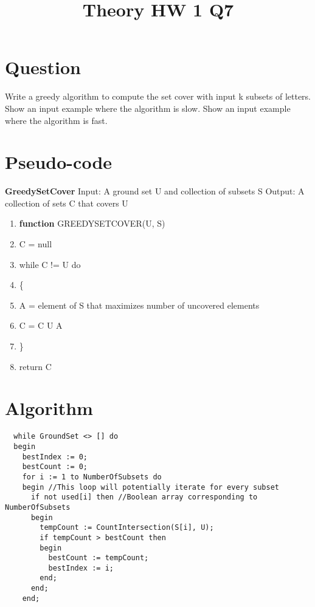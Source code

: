 \documentclass[conference]{IEEEtran}
\begin{document}
\title{Theory HW 1 Q7}

\author{
}

\maketitle

\section{Question}
%
Write a greedy algorithm to compute the set cover with input k subsets of letters. Show an
input example where the algorithm is slow. Show an input example where the algorithm is fast.



\section{Pseudo-code}

\textbf{GreedySetCover}
\newline
Input: A ground set U and collection of subsets S
Output: A collection of sets C that covers U

\begingroup
\renewcommand\labelenumi{\theenumi:}
\begin{enumerate}
\item \textbf{function} GREEDYSETCOVER(U, S)  \label{item:1}
\item C = null \label{item:2}
\item while C != U do \label{item:3}
\item \{ \label{item:4}
\item \indent A = element of S that maximizes number of uncovered elements \label{item:5}
\item \indent C = C U A \label{item:6}
\item \indent \} \label{item:7}
\item \indent return C \label{item:8}
\end{enumerate}
\endgroup

\section{Algorithm}
\begin{verbatim}
  while GroundSet <> [] do
  begin
    bestIndex := 0;
    bestCount := 0;
    for i := 1 to NumberOfSubsets do
    begin //This loop will potentially iterate for every subset
      if not used[i] then //Boolean array corresponding to NumberOfSubsets
      begin
        tempCount := CountIntersection(S[i], U);
        if tempCount > bestCount then
        begin
          bestCount := tempCount;
          bestIndex := i;
        end;
      end;
    end;
\end{verbatim}
\end{document}

